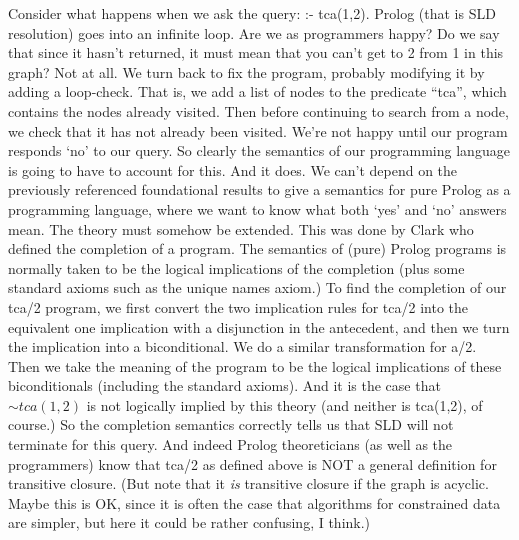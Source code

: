 Consider what happens when we ask the query: :- tca(1,2).  Prolog (that
is SLD resolution) goes into an infinite loop.  Are we as programmers
happy?  Do we say that since it hasn't returned, it must mean that you
can't get to 2 from 1 in this graph?  Not at all.  We turn back to fix
the program, probably modifying it by adding a loop-check.  That is,
we add a list of nodes to the predicate ``tca'', which contains the
nodes already visited.  Then before continuing to search from a node,
we check that it has not already been visited.  We're not happy until
our program responds `no' to our query.  So clearly the semantics of
our programming language is going to have to account for this.  And it
does.  We can't depend on the previously referenced foundational
results to give a semantics for pure Prolog as a programming language,
where we want to know what both `yes' and `no' answers mean.  The
theory must somehow be extended.  This was done by Clark who defined
the completion of a program.  The semantics of (pure) Prolog programs
is normally taken to be the logical implications of the completion
(plus some standard axioms such as the unique names axiom.)  To find
the completion of our tca/2 program, we first convert the two
implication rules for tca/2 into the equivalent one implication with a
disjunction in the antecedent, and then we turn the implication into a
biconditional.  We do a similar transformation for a/2.  Then we take
the meaning of the program to be the logical implications of these
biconditionals (including the standard axioms).  And it is the case
that $\sim tca(1,2)$ is not logically implied by this theory (and
neither is tca(1,2), of course.)  So the completion semantics correctly
tells us that SLD will not terminate for this query.  And indeed
Prolog theoreticians (as well as the programmers) know that tca/2 as
defined above is NOT a general definition for transitive closure.
(But note that it {\em is} transitive closure if the graph is acyclic.
Maybe this is OK, since it is often the case that algorithms for
constrained data are simpler, but here it could be rather confusing, I
think.)

